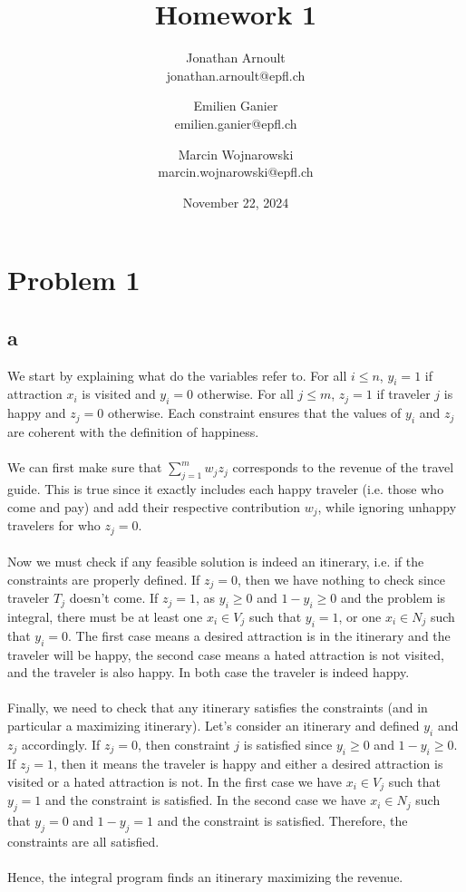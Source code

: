 \documentclass[a4paper, 11pt]{article}
\title{Homework 1}
\author{
    Jonathan Arnoult \\ jonathan.arnoult@epfl.ch
    \and Emilien Ganier \\ emilien.ganier@epfl.ch
    \and Marcin Wojnarowski \\ marcin.wojnarowski@epfl.ch
}
\date{November 22, 2024}
\begin{document}
\maketitle

\section*{Problem 1}

\subsection*{a}
We start by explaining what do the variables refer to. For all $i\leq n$, $y_i=1$ if attraction $x_i$ is visited and $y_i=0$ otherwise. For all $j\leq m$, $z_j=1$ if traveler $j$ is happy and $z_j=0$ otherwise. Each constraint ensures that the values of $y_i$ and $z_j$ are coherent with the definition of happiness.\\\\
We can first make sure that $\sum^m_{j=1} w_jz_j$ corresponds to the revenue of the travel guide. This is true since it exactly includes each happy traveler (i.e. those who come and pay) and add their respective contribution $w_j$, while ignoring unhappy travelers for who $z_j=0$.\\\\
Now we must check if any feasible solution is indeed an itinerary, i.e. if the constraints are properly defined. If $z_j=0$, then we have nothing to check since traveler $T_j$ doesn't come. If $z_j=1$, as $y_i\geq 0$ and $1-y_i\geq 0$ and the problem is integral, there must be at least one $x_i\in V_j$ such that $y_i=1$, or one $x_i\in N_j$ such that $y_i=0$. The first case means a desired attraction is in the itinerary and the traveler will be happy, the second case means a hated attraction is not visited, and the traveler is also happy. In both case the traveler is indeed happy.\\\\
Finally, we need to check that any itinerary satisfies the constraints (and in particular a maximizing itinerary). Let's consider an itinerary and defined $y_i$ and $z_j$ accordingly. If $z_j=0$, then constraint $j$ is satisfied since $y_i\geq 0$ and $1-y_i\geq 0$. If $z_j=1$, then it means the traveler is happy and either a desired attraction is visited or a hated attraction is not. In the first case we have $x_i\in V_j$ such that $y_j=1$ and the constraint is satisfied. In the second case we have $x_i\in N_j$ such that $y_j=0$ and $1-y_j=1$ and the constraint is satisfied. Therefore, the constraints are all satisfied.\\\\
Hence, the integral program finds an itinerary maximizing the revenue.
\end{document}
